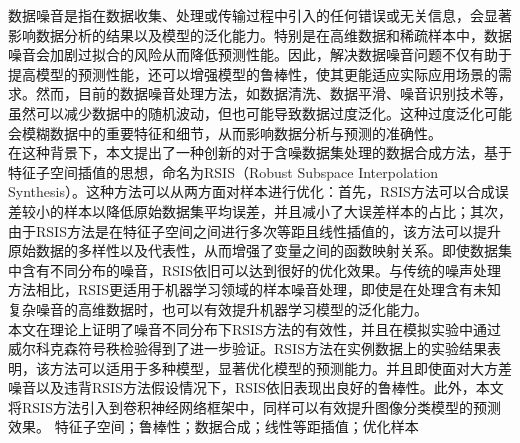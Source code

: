 \documentclass{NauThesis}
\begin{document}
\Statement

\begin{ZhAbstract}
    数据噪音是指在数据收集、处理或传输过程中引入的任何错误或无关信息，会显著影响数据分析的结果以及模型的泛化能力。特别是在高维数据和稀疏样本中，数据噪音会加剧过拟合的风险从而降低预测性能。因此，解决数据噪音问题不仅有助于提高模型的预测性能，还可以增强模型的鲁棒性，使其更能适应实际应用场景的需求。然而，目前的数据噪音处理方法，如数据清洗、数据平滑、噪音识别技术等，虽然可以减少数据中的随机波动，但也可能导致数据过度泛化。这种过度泛化可能会模糊数据中的重要特征和细节，从而影响数据分析与预测的准确性。
\\\hspace*{2em}在这种背景下，本文提出了一种创新的对于含噪数据集处理的数据合成方法，基于特征子空间插值的思想，命名为RSIS（Robust Subspace Interpolation Synthesis）。这种方法可以从两方面对样本进行优化：首先，RSIS方法可以合成误差较小的样本以降低原始数据集平均误差，并且减小了大误差样本的占比；其次，由于RSIS方法是在特征子空间之间进行多次等距且线性插值的，该方法可以提升原始数据的多样性以及代表性，从而增强了变量之间的函数映射关系。即使数据集中含有不同分布的噪音，RSIS依旧可以达到很好的优化效果。与传统的噪声处理方法相比，RSIS更适用于机器学习领域的样本噪音处理，即使是在处理含有未知复杂噪音的高维数据时，也可以有效提升机器学习模型的泛化能力。
\\\hspace*{2em}本文在理论上证明了噪音不同分布下RSIS方法的有效性，并且在模拟实验中通过威尔科克森符号秩检验得到了进一步验证。RSIS方法在实例数据上的实验结果表明，该方法可以适用于多种模型，显著优化模型的预测能力。并且即使面对大方差噪音以及违背RSIS方法假设情况下，RSIS依旧表现出良好的鲁棒性。此外，本文将RSIS方法引入到卷积神经网络框架中，同样可以有效提升图像分类模型的预测效果。
    \ZhKeywords 特征子空间；鲁棒性；数据合成；线性等距插值；优化样本
\end{ZhAbstract}
\end{document}
